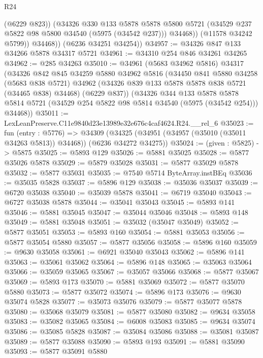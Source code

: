\begin{lexlean}{R24}
\begin{coremodule}
                (@6229 @823))
              (@34326
                @330
                @133
                @5878
                @5878
                @5800
                @5721
                (@34529 @237 @5822 @98 @5800 @34540 (@5975 (@34542 @237)))
                @34468))
            (@11578 @34242 @5799))
          @34468))
      (@6236 @34251 @34254))
@34957 := @34326 @847 @133 @34266 @5878 @34317 @5721
@34961 := @34310 @254 @846 @34261 @34265
@34962 := @285 @34263
@35010 := @34961
    (@5683 @34962 @5816)
    @34317
    (@34326
      @842
      @845
      @34259
      @5880
      @34962
      @5816
      (@34450
        @841
        @5880
        @34258
        (@5683 @838 @5721)
        @34962
        (@34326 @839 @133 @5878 @5878 @838 @5721 (@34465 @838) @34468)
        (@6229 @837))
      (@34326
        @344
        @133
        @5878
        @5878
        @5814
        @5721
        (@34529 @254 @5822 @98 @5814 @34540 (@5975 (@34542 @254)))
        @34468))
@35011 := LexLeanPreserve.C11e9840d23e13989e32e676c4caf4624.R24.__rel_6
@35023 := fun (entry : @5776) =>
  @34309 (@34325 (@34951 (@34957 (@35010 (@35011 @34263 @5813)) @34468)) (@6236 @34272 @34275))
@35024 := (given : @5825) -> @5875
@35025 := @5893 @129
@35026 := @5881 @35025
@35028 := @5877 @35026 @5878
@35029 := @5879 @35028
@35031 := @5877 @35029 @5878
@35032 := @5877 @35031
@35035 := @7540 @5714 ByteArray.instBEq
@35036 := @35035 @5828
@35037 := @5896 @129
@35038 := @35036 @35037
@35039 := @6720 @35038
@35040 := @35039 @5878
@35041 := @6719 @35040
@35043 := @6727 @35038 @5878
@35044 := @35041 @35043
@35045 := @5893 @141
@35046 := @5881 @35045
@35047 := @35044 @35046
@35048 := @5893 @148
@35049 := @5881 @35048
@35051 := @35032 (@35047 @35049)
@35052 := @5877 @35051
@35053 := @5893 @160
@35054 := @5881 @35053
@35056 := @5877 @35054 @5880
@35057 := @5877 @35056
@35058 := @5896 @160
@35059 := @9630 @35058
@35061 := @6921 @35040 @35043
@35062 := @5896 @141
@35063 := @35061 @35062
@35064 := @5896 @148
@35065 := @35063 @35064
@35066 := @35059 @35065
@35067 := @35057 @35066
@35068 := @5877 @35067
@35069 := @5893 @173
@35070 := @5881 @35069
@35072 := @5877 @35070 @5880
@35073 := @5877 @35072
@35074 := @5896 @173
@35076 := @9630 @35074 @5828
@35077 := @35073 @35076
@35079 := @5877 @35077 @5878
@35080 := @35068 @35079
@35081 := @5877 @35080
@35082 := @9634 @35058
@35083 := @35082 @35065
@35084 := @6008 @35083
@35085 := @9634 @35074
@35086 := @35085 @5828
@35087 := @35084 @35086
@35088 := @35081 @35087
@35089 := @5877 @35088
@35090 := @5893 @193
@35091 := @5881 @35090
@35093 := @5877 @35091 @5880

\end{coremodule}
\end{lexlean}
